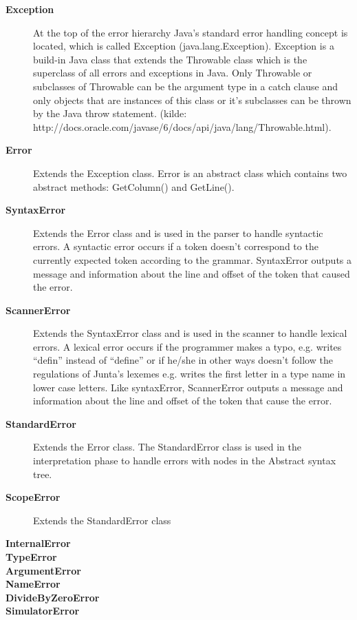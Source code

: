\begin{description}
\item[\textbf{Exception}] At the top of the error hierarchy Java's standard error handling concept is located, which is called Exception (java.lang.Exception). Exception is a build-in Java class that extends the Throwable class which is the superclass of all errors and exceptions in Java. Only Throwable or subclasses of Throwable can be the argument type in a catch clause and only objects that are instances of this class or it's subclasses can be thrown by the Java throw statement. (kilde: http://docs.oracle.com/javase/6/docs/api/java/lang/Throwable.html).  

\item[\textbf{Error}] Extends the Exception class. Error is an abstract class which contains two abstract methods: GetColumn() and GetLine().

\item[\textbf{SyntaxError}] Extends the Error class and is used in the parser to handle syntactic errors. A syntactic error occurs if a token doesn't correspond to the currently expected token according to the grammar. SyntaxError outputs a message and information about the line and offset of the token that caused the error. 

\item[\textbf{ScannerError}] Extends the SyntaxError class and is used in the scanner to handle lexical errors. A lexical error occurs if the programmer makes a typo, e.g. writes ``defin'' instead of ``define'' or if he/she in other ways doesn't follow the regulations of Junta's lexemes e.g. writes the first letter in a type name in lower case letters. Like syntaxError, ScannerError outputs a message and information about the line and offset of the token that cause the error.  

\item[\textbf{StandardError}] Extends the Error class. The StandardError class is used in the interpretation phase to handle errors with nodes in the Abstract syntax tree.  

\item[\textbf{ScopeError}] Extends the StandardError class

\item[\textbf{InternalError}]

\item[\textbf{TypeError}]

\item[\textbf{ArgumentError}]

\item[\textbf{NameError}]

\item[\textbf{DivideByZeroError}]

\item[\textbf{SimulatorError}]
\end{description}


    
